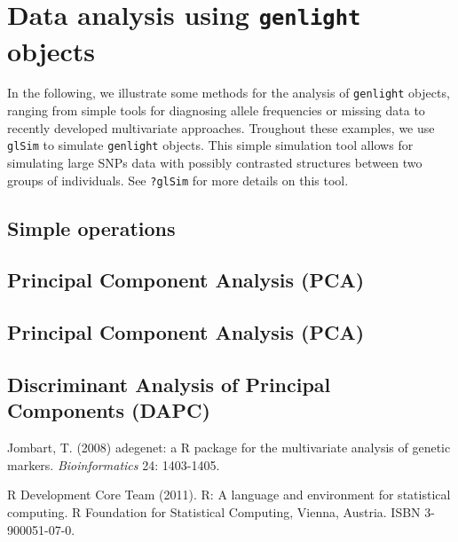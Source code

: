 \documentclass{article}
\begin{document}
\section{Data analysis using \texttt{genlight} objects}

In the following, we illustrate some methods for the analysis of \texttt{genlight} objects, ranging
from simple tools for diagnosing allele frequencies or missing data to recently developed multivariate approaches.
Troughout these examples, we use \texttt{glSim} to simulate \texttt{genlight} objects.
This simple simulation tool allows for simulating large SNPs data with possibly contrasted
structures between two groups of individuals. See \texttt{?glSim} for more details on this tool.



\subsection{Simple operations}





\subsection{Principal Component Analysis (PCA)}



\subsection{Principal Component Analysis (PCA)}



\subsection{Discriminant Analysis of Principal Components (DAPC)}







\begin{thebibliography}{9}

  Jombart, T. (2008) adegenet: a R package for the multivariate
  analysis of genetic markers. \textit{Bioinformatics} 24: 1403-1405.

  R Development Core Team (2011). R: A language and environment for
  statistical computing. R Foundation for Statistical Computing,
  Vienna, Austria. ISBN 3-900051-07-0.

\end{thebibliography}
\end{document}
